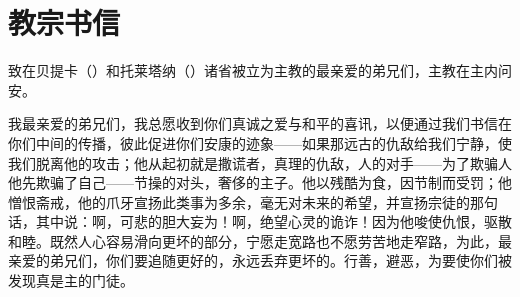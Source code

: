 
\section{教宗书信}

\par

致在贝提卡（）和托莱塔纳（）诸省被立为主教的最亲爱的弟兄们，主教在主内问安。\par

我最亲爱的弟兄们，我总愿收到你们真诚之爱与和平的喜讯，以便通过我们书信在你们中间的传播，彼此促进你们安康的迹象——如果那远古的仇敌给我们宁静，使我们脱离他的攻击；他从起初就是撒谎者，真理的仇敌，人的对手——为了欺骗人他先欺骗了自己——节操的对头，奢侈的主子。他以残酷为食，因节制而受罚；他憎恨斋戒，他的爪牙宣扬此类事为多余，毫无对未来的希望，并宣扬宗徒的那句话，其中说：啊，可悲的胆大妄为！啊，绝望心灵的诡诈！因为他唆使仇恨，驱散和睦。既然人心容易滑向更坏的部分，宁愿走宽路也不愿劳苦地走窄路，为此，最亲爱的弟兄们，你们要追随更好的，永远丢弃更坏的。行善，避恶，为要使你们被发现真是主的门徒。\par

